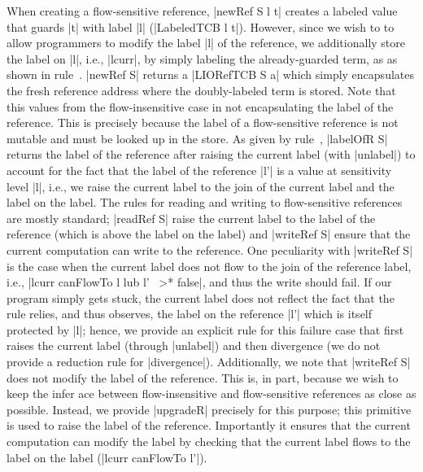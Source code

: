 When creating a flow-sensitive reference, |newRef S l t| creates a labeled
value that guards |t| with label |l| (|LabeledTCB l t|).
%
However, since we wish to to allow programmers to modify the label |l| of the
reference, we additionally store the label on |l|, i.e., |lcurr|, by simply
labeling the already-guarded term, as as shown in rule~.
%
|newRef S| returns a |LIORefTCB S a| which simply encapsulates the fresh
reference address where the doubly-labeled term is stored.
%
Note that this values from the flow-insensitive case in not encapsulating the
label of the reference.
%
This is precisely because the label of a flow-sensitive reference is not
mutable and must be looked up in the store.
%
As given by rule~, |labelOfR S| returns the label of the
reference after raising the current label (with |unlabel|) to account for the
fact that the label of the reference |l'| is a value at sensitivity level |l|,
i.e., we raise the current label to the join of the current label and the label
on the label.
%
The rules for reading and writing to flow-sensitive references are mostly
standard; |readRef S| raise the current label to the label of the reference
(which is above the label on the label) and |writeRef S| ensure that the
current computation can write to the reference.
%
One peculiarity with |writeRef S| is the case when the current label does not
flow to the join of the reference label, i.e., |lcurr canFlowTo l lub l' ~>*
false|, and thus the write should fail.
%
If our program simply gets stuck, the current label does not reflect the fact
that the rule relies, and thus observes, the label on the reference |l'| which
is itself protected by |l|; hence, we provide an explicit rule for this failure
case that first raises the current label (through |unlabel|) and then
divergence (we do not provide a reduction rule for |divergence|).
%
Additionally, we note that |writeRef S| does not modify the label of the reference.
%
This is, in part, because we wish to keep the infer ace between
flow-insensitive and flow-sensitive references as close as possible.
%
Instead, we provide |upgradeR| precisely for this purpose; this primitive is
used to raise the label of the reference.
%
Importantly it ensures that the current computation can modify the label by
checking that the current label flows to the label on the label (|lcurr
canFlowTo l'|).


